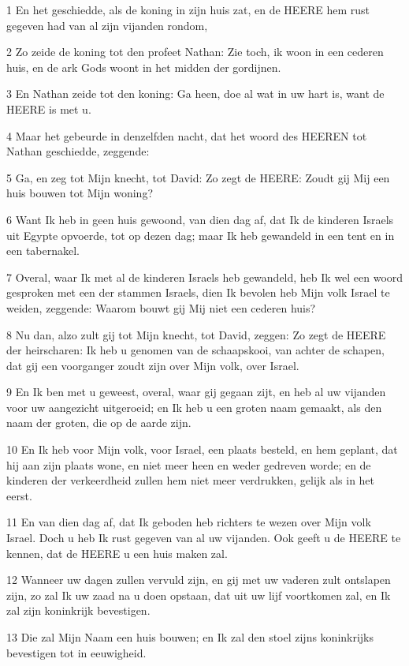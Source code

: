 \par 1 En het geschiedde, als de koning in zijn huis zat, en de HEERE hem rust gegeven had van al zijn vijanden rondom,
\par 2 Zo zeide de koning tot den profeet Nathan: Zie toch, ik woon in een cederen huis, en de ark Gods woont in het midden der gordijnen.
\par 3 En Nathan zeide tot den koning: Ga heen, doe al wat in uw hart is, want de HEERE is met u.
\par 4 Maar het gebeurde in denzelfden nacht, dat het woord des HEEREN tot Nathan geschiedde, zeggende:
\par 5 Ga, en zeg tot Mijn knecht, tot David: Zo zegt de HEERE: Zoudt gij Mij een huis bouwen tot Mijn woning?
\par 6 Want Ik heb in geen huis gewoond, van dien dag af, dat Ik de kinderen Israels uit Egypte opvoerde, tot op dezen dag; maar Ik heb gewandeld in een tent en in een tabernakel.
\par 7 Overal, waar Ik met al de kinderen Israels heb gewandeld, heb Ik wel een woord gesproken met een der stammen Israels, dien Ik bevolen heb Mijn volk Israel te weiden, zeggende: Waarom bouwt gij Mij niet een cederen huis?
\par 8 Nu dan, alzo zult gij tot Mijn knecht, tot David, zeggen: Zo zegt de HEERE der heirscharen: Ik heb u genomen van de schaapskooi, van achter de schapen, dat gij een voorganger zoudt zijn over Mijn volk, over Israel.
\par 9 En Ik ben met u geweest, overal, waar gij gegaan zijt, en heb al uw vijanden voor uw aangezicht uitgeroeid; en Ik heb u een groten naam gemaakt, als den naam der groten, die op de aarde zijn.
\par 10 En Ik heb voor Mijn volk, voor Israel, een plaats besteld, en hem geplant, dat hij aan zijn plaats wone, en niet meer heen en weder gedreven worde; en de kinderen der verkeerdheid zullen hem niet meer verdrukken, gelijk als in het eerst.
\par 11 En van dien dag af, dat Ik geboden heb richters te wezen over Mijn volk Israel. Doch u heb Ik rust gegeven van al uw vijanden. Ook geeft u de HEERE te kennen, dat de HEERE u een huis maken zal.
\par 12 Wanneer uw dagen zullen vervuld zijn, en gij met uw vaderen zult ontslapen zijn, zo zal Ik uw zaad na u doen opstaan, dat uit uw lijf voortkomen zal, en Ik zal zijn koninkrijk bevestigen.
\par 13 Die zal Mijn Naam een huis bouwen; en Ik zal den stoel zijns koninkrijks bevestigen tot in eeuwigheid.
